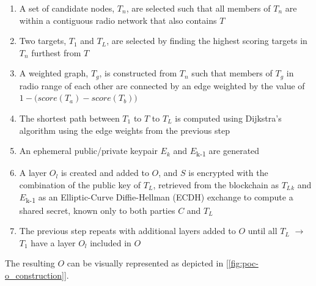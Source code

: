 \documentclass[UTF8, 10pt, nonatbib, nocopyrightspace, reprint]{sigplanconf}
\newcommand{\figref}[1]{[\autoref{#1}]}
\begin{document}
\begin{enumerate}
  \item A set of candidate nodes, $T_n$, are selected such that all members of $T_n$ are within a contiguous radio network that also contains $T$
  \item Two targets, $T_1$ and $T_L$, are selected by finding the highest scoring targets in $T_n$ furthest from $T$
  \item A weighted graph, $T_g$, is constructed from $T_n$ such that members of $T_g$ in radio range of each other are connected by an edge weighted by the value of \(1 - \Big({score(T_a) - score(T_b)}\Big)\)
  \item The shortest path between $T_1$ to $T$ to $T_L$ is computed using Dijkstra's algorithm\cite{dijkstra} using the edge weights from the previous step
	\item An ephemeral public/private keypair $E_k$ and $E$\textsubscript{k-1} are generated
	\item A layer $O_l$ is created and added to $O$, and $S$ is encrypted with the combination of the public key of $T_L$, retrieved from the blockchain as $T_L$$_k$ and $E$\textsubscript{k-1} as an Elliptic-Curve Diffie-Hellman (ECDH) exchange to compute a shared secret, known only to both parties $C$ and $T_L$
  \item The previous step repeats with additional layers added to $O$ until all $T_L$ $\rightarrow$ $T_1$ have a layer $O_l$ included in $O$
\end{enumerate}

The resulting $O$ can be visually represented as depicted in \figref{fig:poc-o_construction}.
\end{document}
